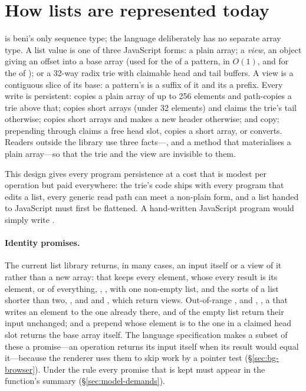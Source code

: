 \section{How lists are represented today}
\label{sec:bg-lists}

 is beni's only sequence type; the language deliberately has no separate array type. A
list value is one of three JavaScript forms: a plain array; a \emph{view}, an object
 giving an offset into a base array (used for the  of a pattern, in
$O(1)$, and for the  of ); or a 32-way radix trie with claimable head and
tail buffers. A view is a contiguous slice of its base: a pattern's  is a suffix of it and its
 a prefix. Every write is persistent:  copies a plain array of up to 256 elements and
path-copies a trie above that;  copies short arrays (under 32 elements) and claims
the trie's tail otherwise;  copies short arrays and makes a new header otherwise;
 and  copy; prepending through \code{[ x, …xs ]} claims a free head slot,
copies a short array, or converts. Readers outside the library use three facts---,
 and a  method that materialises a plain array---so that the trie
and the view are invisible to them.

This design gives every program persistence at a cost that is modest per operation but paid
everywhere: the trie's code ships with every program that edits a list, every generic read path
can meet a non-plain form, and a list handed to JavaScript must first be flattened. A hand-written
JavaScript program would simply write .

\paragraph{Identity promises.} The current list library returns, in many cases, an input itself or a
view of it rather than a new array:  that keeps every element,  whose every
result is \code{===} its element,  or  of everything, ,
,  with one non-empty list,  and the sorts of a list
shorter than two, , and  and , which return views. Out-of-range
,  and , , a  that writes an element
\code{===} to the one already there, and  of the empty list return their input unchanged;
and a prepend whose element is \code{===} to the one in a claimed head slot returns the base array
itself. The language specification makes a subset of these a promise---an operation returns its input
itself when its result would equal it---because the renderer uses them to skip work by a pointer test
(\S\ref{sec:bg-browser}). Under the rule every promise that is kept must appear in the function's
summary (\S\ref{sec:model-demands}).

